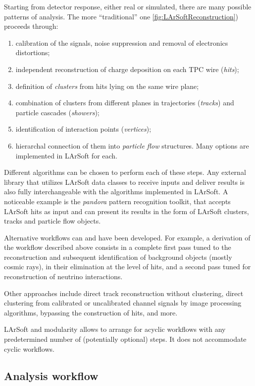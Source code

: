 Starting from detector response, either real or simulated, there are
many possible patterns of analysis. The more ``traditional'' one \cref{fig:LArSoftReconstruction}) proceeds through:
\begin{enumerate}
  \item calibration of the signals, noise suppression and removal of electronics distortions;
  \item independent reconstruction of charge deposition on each TPC wire (\emph{hits});
  \item definition of \emph{clusters} from hits lying on the same wire plane;
  \item combination of clusters from different planes in trajectories (\emph{tracks}) and particle cascades (\emph{showers});
  \item identification of interaction points (\emph{vertices});
  \item hierarchal connection of them into \emph{particle flow} structures. Many options are implemented in LArSoft for each.
\end{enumerate}
Different algorithms can be chosen to perform each of these steps.
Any external library that utilizes LArSoft data classes to receive
inputs and deliver results is also fully interchangeable with the
algorithms implemented in LArSoft. A noticeable example is the
\emph{pandora} pattern recognition toolkit, that accepts LArSoft hits as
input and can present its results in the form of LArSoft clusters,
tracks and particle flow objects.

Alternative workflows can and have been developed.
For example, a derivation of the workflow described above consists in a complete
first pass tuned to the reconstruction and subsequent identification of background
objects (mostly cosmic rays), in their elimination at the level of hits,
and a second pass tuned for reconstruction of neutrino interactions.

Other approaches include direct track reconstruction without clustering,
direct clustering from calibrated or uncalibrated channel signals
by image processing algorithms, bypassing the construction of hits, and more.

LArSoft and \ART modularity allows to arrange for acyclic workflows
with any predetermined number of (potentially optional) steps.
It does not accommodate cyclic workflows.


\subsection{Analysis workflow}
\label{ssec:Workflows:Analysis}


